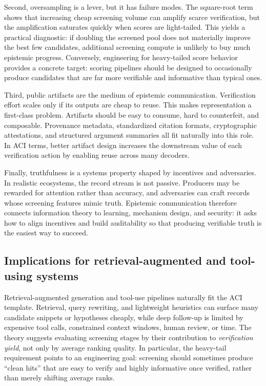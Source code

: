 \documentclass[twocolumn]{scholar7}
\begin{document}
Second, oversampling is a lever, but it has failure modes. The square-root term shows that increasing cheap screening volume can amplify scarce verification, but the amplification saturates quickly when scores are light-tailed. This yields a practical diagnostic: if doubling the screened pool does not materially improve the best few candidates, additional screening compute is unlikely to buy much epistemic progress. Conversely, engineering for heavy-tailed score behavior provides a concrete target: scoring pipelines should be designed to occasionally produce candidates that are far more verifiable and informative than typical ones.

Third, public artifacts are the medium of epistemic communication. Verification effort scales only if its outputs are cheap to reuse. This makes representation a first-class problem. Artifacts should be easy to consume, hard to counterfeit, and composable. Provenance metadata, standardized citation formats, cryptographic attestations, and structured argument summaries all fit naturally into this role. In ACI terms, better artifact design increases the downstream value of each verification action by enabling reuse across many decoders.

Finally, truthfulness is a systems property shaped by incentives and adversaries. In realistic ecosystems, the record stream is not passive. Producers may be rewarded for attention rather than accuracy, and adversaries can craft records whose screening features mimic truth. Epistemic communication therefore connects information theory to learning, mechanism design, and security: it asks how to align incentives and build auditability so that producing verifiable truth is the easiest way to succeed.

\subsection{Implications for retrieval-augmented and tool-using systems}
Retrieval-augmented generation and tool-use pipelines naturally fit the ACI template. Retrieval, query rewriting, and lightweight heuristics can surface many candidate snippets or hypotheses cheaply, while deep follow-up is limited by expensive tool calls, constrained context windows, human review, or time. The theory suggests evaluating screening stages by their contribution to \emph{verification yield}, not only by average ranking quality. In particular, the heavy-tail requirement points to an engineering goal: screening should sometimes produce ``clean hits'' that are easy to verify and highly informative once verified, rather than merely shifting average ranks.
\end{document}
